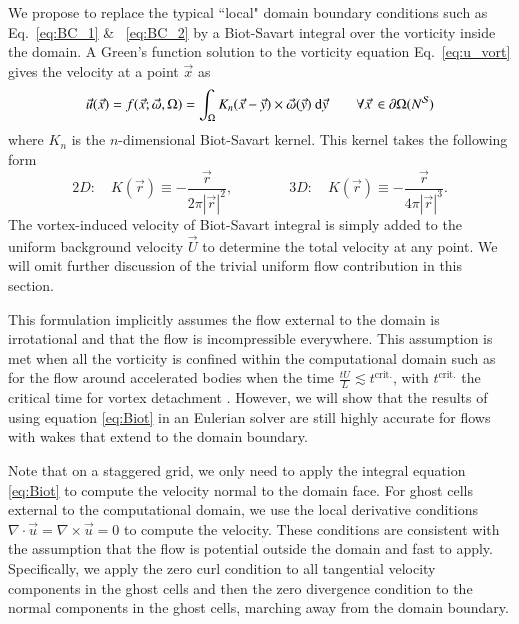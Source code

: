 \documentclass[final,1p,times]{elsarticle}
\begin{document}
We propose to replace the typical ``local" domain boundary conditions such as Eq.~\eqref{eq:BC_1} \& ~\eqref{eq:BC_2} by a Biot-Savart integral over the vorticity inside the domain. A Green's function solution to the vorticity equation Eq.~\eqref{eq:u_vort} gives the velocity at a point $\vec x$ as
\begin{equation}\label{eq:Biot}
    {\vec u}({\vec x}) = f(\vec x; \vec\omega,\Omega) = \int_\Omega K_{n}({\vec x} - \vec{y})\times \vec\omega({\vec y})\text{ d}\vec{y} \quad\quad \forall \vec x\, \in \partial\Omega (N^{\cal S})
\end{equation}
where $K_n$ is the $n$-dimensional Biot-Savart kernel. This kernel takes the following form \cite{Eldredge2019MathematicalFlows}
\begin{equation}\label{eq:kernels}
    2D:\quad K(\vec r)\equiv -\frac{\vec{r}}{2\pi|\vec{r}|^2}, \qquad\qquad 3D:\quad K(\vec r)\equiv -\frac{\vec{r}}{4\pi|\vec{r}|^3}.
\end{equation}
The vortex-induced velocity of Biot-Savart integral is simply added to the uniform background velocity $\vec U$ to determine the total velocity at any point. We will omit further discussion of the trivial uniform flow contribution in this section.

This formulation implicitly assumes the flow external to the domain is irrotational and that the flow is incompressible everywhere. This assumption is met when all the vorticity is confined within the computational domain such as for the flow around accelerated bodies when the time $\frac{tU}{L}\lesssim t^{\text{crit.}}$, with $t^{\text{crit.}}$ the critical time for vortex detachment \cite{Shusser2000EnergyRing}. However, we will show that the results of using equation \eqref{eq:Biot} in an Eulerian solver are still highly accurate for flows with wakes that extend to the domain boundary. 

Note that on a staggered grid, we only need to apply the integral equation \eqref{eq:Biot} to compute the velocity normal to the domain face. For ghost cells external to the computational domain, we use the local derivative conditions $\nabla\cdot\vec{u} = \nabla\times\vec{u}=0$ to compute the velocity. These conditions are consistent with the assumption that the flow is potential outside the domain and fast to apply. Specifically, we apply the zero curl condition to all tangential velocity components in the ghost cells and then the zero divergence condition to the normal components in the ghost cells, marching away from the domain boundary.
\end{document}
